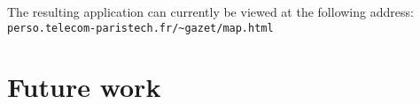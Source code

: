 \documentclass[a4paper,11pt]{report}
\begin{document}
The resulting application can currently be viewed at the following address:
\texttt{perso.telecom-paristech.fr/\textasciitilde{}gazet/map.html}



\chapter{Future work}

\end{document}

